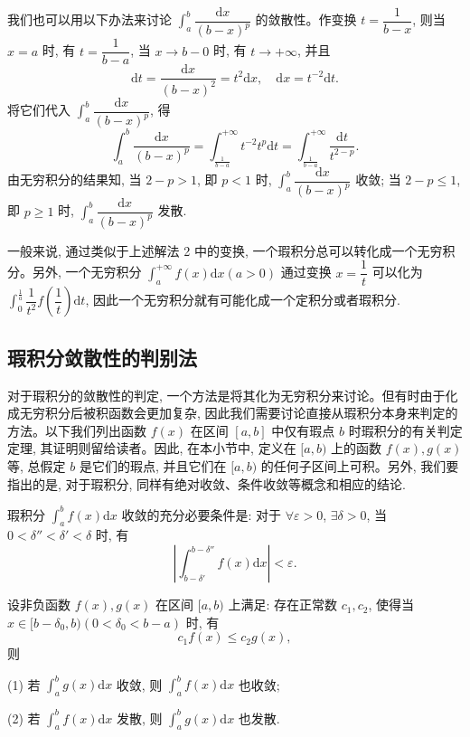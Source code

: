 \begin{solve}[{解法 2}]
我们也可以用以下办法来讨论 $\int_a^b\dfrac{\mathrm dx}{(b-x)^p}$ 的敛散性。作变换 $t=\dfrac1{b-x}$, 则当 $x=a$ 时, 有 $t=\dfrac1{b-a}$, 当 $x\to b-0$ 时, 有 $t\to+\infty$, 并且
\[
  \mathrm dt=\frac{\mathrm dx}{(b-x)^2}=t^2\mathrm dx,\quad
  \mathrm dx=t^{-2}\mathrm dt.
\]
将它们代入 $\int_a^b\dfrac{\mathrm dx}{(b-x)^p}$, 得
\[
  \int_a^b\frac{\mathrm dx}{(b-x)^p}
  =
  \int_{\frac1{b-a}}^{+\infty}t^{-2}t^p\mathrm dt
  =
  \int_{\frac1{b-a}}^{+\infty}\frac{\mathrm dt}{t^{2-p}}.
\]
由无穷积分的结果知, 当 $2-p>1$, 即 $p<1$ 时, $\int_a^b\dfrac{\mathrm dx}{(b-x)^p}$ 收敛; 当 $2-p\leq1$, 即 $p\geq1$ 时, $\int_a^b\dfrac{\mathrm dx}{(b-x)^p}$ 发散.

一般来说, 通过类似于上述解法 2 中的变换, 一个瑕积分总可以转化成一个无穷积分。另外, 一个无穷积分 $\int_a^{+\infty}f(x)\mathrm dx(a>0)$ 通过变换 $x=\dfrac1t$ 可以化为 $\int_0^{\frac1a}\dfrac1{t^2}f\left(\dfrac1t\right)\mathrm dt$, 因此一个无穷积分就有可能化成一个定积分或者瑕积分.
\end{solve}


\subsection{瑕积分敛散性的判别法}
\label{subsec:ma-8-3-2}

对于瑕积分的敛散性的判定, 一个方法是将其化为无穷积分来讨论。但有时由于化成无穷积分后被积函数会更加复杂, 因此我们需要讨论直接从瑕积分本身来判定的方法。以下我们列出函数 $f(x)$ 在区间 $[a,b]$ 中仅有瑕点 $b$ 时瑕积分的有关判定定理, 其证明则留给读者。因此, 在本小节中, 定义在 $[a,b)$ 上的函数 $f(x),g(x)$ 等, 总假定 $b$ 是它们的瑕点, 并且它们在 $[a,b)$ 的任何子区间上可积。另外, 我们要指出的是, 对于瑕积分, 同样有绝对收敛、条件收敛等概念和相应的结论.

\begin{theorem}[{柯西准则}]\label{theorem:ma-8-3-1}
瑕积分 $\int_a^b f(x)\mathrm dx$ 收敛的充分必要条件是: 对于 $\forall\varepsilon>0$, $\exists\delta>0$, 当 $0<\delta''<\delta'<\delta$ 时, 有
\[
  \left|\int_{b-\delta'}^{b-\delta''}f(x)\mathrm dx\right|<\varepsilon.
\]
\end{theorem}


\begin{theorem}\label{theorem:ma-8-3-2}
设非负函数 $f(x),g(x)$ 在区间 $[a,b)$ 上满足: 存在正常数 $c_1,c_2$, 使得当 $x\in[b-\delta_0,b)(0<\delta_0<b-a)$ 时, 有
\[
  c_1f(x)\leq c_2g(x),
\]
则

(1) 若 $\int_a^b g(x)\mathrm dx$ 收敛, 则 $\int_a^b f(x)\mathrm dx$ 也收敛;

(2) 若 $\int_a^b f(x)\mathrm dx$ 发散, 则 $\int_a^b g(x)\mathrm dx$ 也发散.
\end{theorem}


